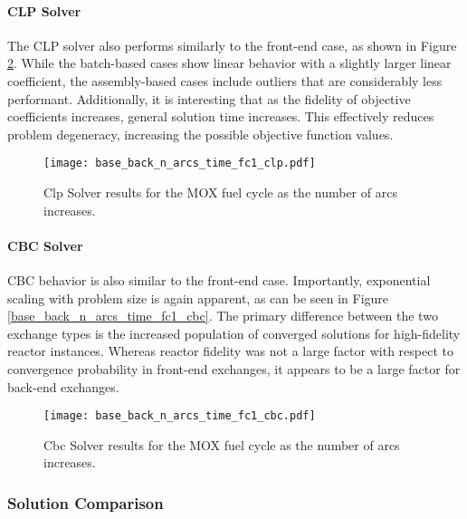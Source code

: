 \paragraph{CLP Solver}

The CLP solver also performs similarly to the front-end case, as shown in Figure
\ref{fig:base_back_n_arcs_time_fc1_clp}. While the batch-based cases show linear
behavior with a slightly larger linear coefficient, the assembly-based cases
include outliers that are considerably less performant. Additionally, it is
interesting that as the fidelity of objective coefficients increases, general
solution time increases. This effectively reduces problem degeneracy, increasing
the possible objective function values.

\begin{figure}[h!]
  \begin{center}
    \texttt{[image: base\_back\_n\_arcs\_time\_fc1\_clp.pdf]}
    \caption[]{
      \label{fig:base_back_n_arcs_time_fc1_clp}
      Clp Solver results for the MOX fuel cycle as the number of arcs
      increases.      
    }
  \end{center}
\end{figure}

\paragraph{CBC Solver}

CBC behavior is also similar to the front-end case. Importantly, exponential
scaling with problem size is again apparent, as can be seen in Figure
\ref{base_back_n_arcs_time_fc1_cbc}. The primary difference between the two
exchange types is the increased population of converged solutions for
high-fidelity reactor instances. Whereas reactor fidelity was not a large factor
with respect to convergence probability in front-end exchanges, it appears to be
a large factor for back-end exchanges.
 
\begin{figure}[h!]
  \begin{center}
    \texttt{[image: base\_back\_n\_arcs\_time\_fc1\_cbc.pdf]}
    \caption[]{
      \label{fig:base_back_n_arcs_time_fc1_clp}
      Cbc Solver results for the MOX fuel cycle as the number of arcs
      increases.      
    }
  \end{center}
\end{figure}

\subsubsection{Solution Comparison}\label{sec:res:scale:front:soln}

